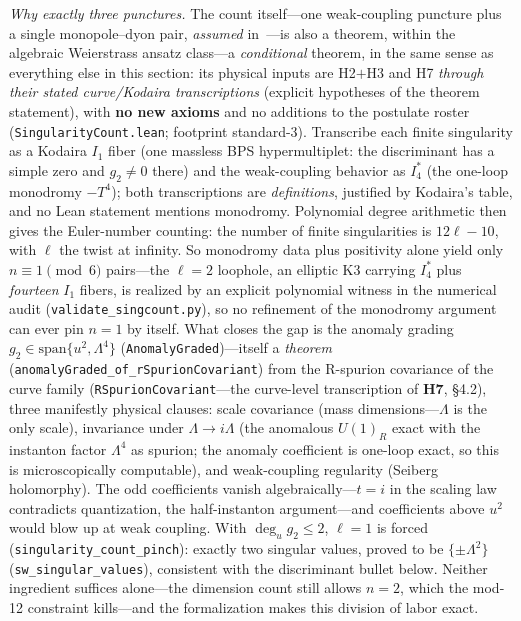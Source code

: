 \documentclass{article}
\theoremstyle{plain}
\theoremstyle{definition}
\numberwithin{equation}{section}
\newcommand{\code}[1]{\texttt{#1}}
\begin{document}
\begin{itemize}
\emph{Why exactly three punctures.} The count itself---one weak-coupling puncture plus a
single monopole--dyon pair, \emph{assumed} in~\cite{SeibergWitten1994a}---is also a theorem,
within the algebraic Weierstrass ansatz class---a \emph{conditional} theorem, in the same
sense as everything else in this section: its physical inputs are H2$+$H3 and H7
\emph{through their stated curve/Kodaira transcriptions} (explicit hypotheses of the
theorem statement), with \textbf{no new axioms} and no additions to the
postulate roster (\code{SingularityCount.lean}; footprint standard-3). Transcribe each
finite singularity as a Kodaira $I_1$ fiber (one massless BPS hypermultiplet: the
discriminant has a simple zero and $g_2 \neq 0$ there) and the weak-coupling behavior as
$I^*_4$ (the one-loop monodromy $-T^4$); both transcriptions are \emph{definitions},
justified by Kodaira's table, and no Lean statement mentions monodromy. Polynomial degree
arithmetic then gives the Euler-number counting: the number of finite singularities is
$12\ell - 10$, with $\ell$ the twist at infinity. So monodromy data plus positivity alone
yield only $n \equiv 1 \pmod 6$ pairs---the $\ell = 2$ loophole, an elliptic K3 carrying
$I^*_4$ plus \emph{fourteen} $I_1$ fibers, is realized by an explicit polynomial witness in
the numerical audit (\code{validate\_singcount.py}), so no refinement of the monodromy
argument can ever pin $n = 1$ by itself. What closes the gap is the anomaly grading
$g_2 \in \mathrm{span}\{u^2, \Lambda^4\}$ (\code{AnomalyGraded})---itself a
\emph{theorem} (\code{anomalyGraded\_of\_rSpurionCovariant}) from the R-spurion covariance
of the curve family (\code{RSpurionCovariant}---the curve-level transcription of
\textbf{H7}, \S4.2), three manifestly physical clauses: scale
covariance (mass dimensions---$\Lambda$ is the only scale), invariance under
$\Lambda \to i\Lambda$ (the anomalous $U(1)_R$ exact with the instanton factor $\Lambda^4$
as spurion; the anomaly coefficient is one-loop exact, so this is microscopically
computable), and weak-coupling regularity (Seiberg holomorphy). The odd coefficients vanish
algebraically---$t = i$ in the scaling law contradicts quantization, the half-instanton
argument---and coefficients above $u^2$ would blow up at weak coupling. With
$\deg_u g_2 \le 2$, $\ell = 1$ is forced
(\code{singularity\_count\_pinch}): exactly two singular values, proved to be
$\{\pm\Lambda^2\}$ (\code{sw\_singular\_values}), consistent with the discriminant bullet
below. Neither ingredient suffices alone---the dimension count still allows $n = 2$, which
the mod-12 constraint kills---and the formalization makes this division of labor exact.


\end{itemize}
\end{document}

